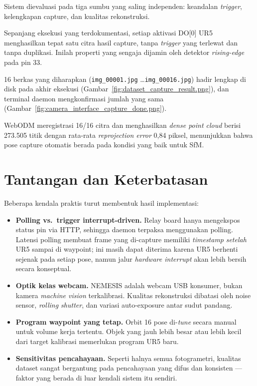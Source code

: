 \documentclass[11pt,a4paper]{article}
\newcommand{\code}[1]{\colorbox{bgcode}{\texttt{\small #1}}}
\begin{document}
Sistem dievaluasi pada tiga sumbu yang saling independen: keandalan \textit{trigger}, kelengkapan capture, dan kualitas rekonstruksi.

\begin{description}[leftmargin=1.4em,itemsep=3pt,style=nextline]
    \item[Keandalan trigger] Sepanjang eksekusi yang terdokumentasi, setiap aktivasi DO[0] UR5 menghasilkan tepat satu citra hasil capture, tanpa \textit{trigger} yang terlewat dan tanpa duplikasi. Inilah properti yang sengaja dijamin oleh detektor \textit{rising-edge} pada pin 33.
    \item[Kelengkapan capture] 16 berkas yang diharapkan (\code{img\_00001.jpg} \ldots \code{img\_00016.jpg}) hadir lengkap di disk pada akhir eksekusi (Gambar~\ref{fig:dataset_capture_result.png}), dan terminal daemon mengkonfirmasi jumlah yang sama (Gambar~\ref{fig:camera_interface_capture_done.png}).
    \item[Kualitas rekonstruksi] WebODM meregistrasi 16/16 citra dan menghasilkan \textit{dense point cloud} berisi 273.505 titik dengan rata-rata \textit{reprojection error} 0,84 piksel, menunjukkan bahwa pose capture otomatis berada pada kondisi yang baik untuk SfM.
\end{description}

\section{Tantangan dan Keterbatasan}

Beberapa kendala praktis turut membentuk hasil implementasi:

\begin{itemize}[leftmargin=1.4em,itemsep=3pt]
    \item \textbf{Polling vs.\ trigger interrupt-driven.} Relay board hanya mengekspos status pin via HTTP, sehingga daemon terpaksa menggunakan polling. Latensi polling membuat frame yang di-capture memiliki \textit{timestamp} \emph{setelah} UR5 sampai di waypoint; ini masih dapat diterima karena UR5 berhenti sejenak pada setiap pose, namun jalur \textit{hardware interrupt} akan lebih bersih secara konseptual.
    \item \textbf{Optik kelas webcam.} NEMESIS adalah webcam USB konsumer, bukan kamera \textit{machine vision} terkalibrasi. Kualitas rekonstruksi dibatasi oleh noise sensor, \textit{rolling shutter}, dan variasi auto-exposure antar sudut pandang.
    \item \textbf{Program waypoint yang tetap.} Orbit 16 pose di-\textit{tune} secara manual untuk volume kerja tertentu. Objek yang jauh lebih besar atau lebih kecil dari target kalibrasi memerlukan program UR5 baru.
    \item \textbf{Sensitivitas pencahayaan.} Seperti halnya semua fotogrametri, kualitas dataset sangat bergantung pada pencahayaan yang difus dan konsisten --- faktor yang berada di luar kendali sistem itu sendiri.
\end{itemize}
\end{document}
